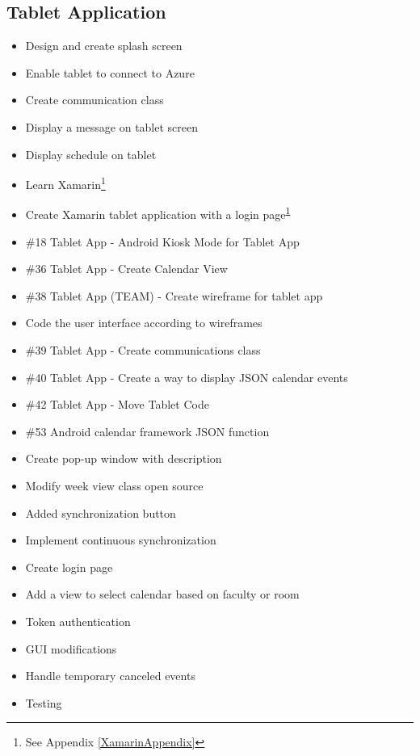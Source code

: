 \subsection*{Tablet Application}
\begin{itemize}
\item Design and create splash screen
\item Enable tablet to connect to Azure
\item Create communication class
\item Display a message on tablet screen
\item Display schedule on tablet	
\item Learn Xamarin\footnote{See Appendix \ref{XamarinAppendix}\label{note1}}
\item Create Xamarin tablet application with a login page\textsuperscript{\ref{note1}}
\item \#18 Tablet App - Android Kiosk Mode for Tablet App
\item \#36 Tablet App - Create Calendar View
\item \#38 Tablet App (TEAM) - Create wireframe for tablet app
\item Code the user interface according to wireframes
\item \#39 Tablet App - Create communications class
\item \#40 Tablet App - Create a way to display JSON calendar events
\item \#42 Tablet App - Move Tablet Code
\item \#53 Android calendar framework JSON function
\item Create pop-up window with description
\item Modify week view class open source
\item Added synchronization button
\item Implement continuous synchronization
\item Create login page
\item Add a view to select calendar based on faculty or room
\item Token authentication
\item GUI modifications
\item Handle temporary canceled events
\item Testing
\end{itemize}

